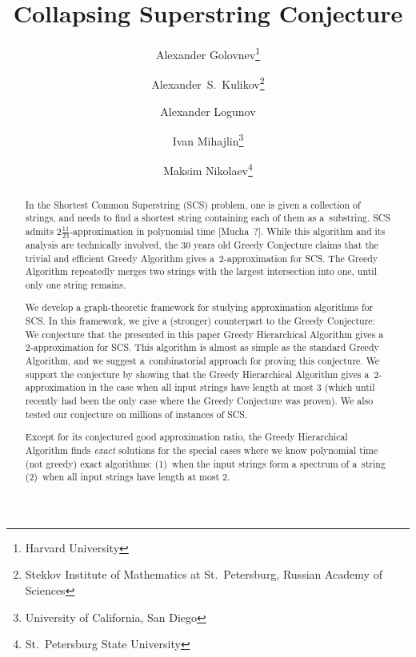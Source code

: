 \documentclass[11pt]{article}
\begin{document}
\sloppy
\begin{titlepage}
\title{Collapsing Superstring Conjecture}
\author{
Alexander Golovnev\thanks{Harvard University}
\and
Alexander~S.~Kulikov\thanks{Steklov Institute of Mathematics at St.~Petersburg, Russian Academy of Sciences}
\and
Alexander Logunov\footnotemark[2]
\and
Ivan Mihajlin\thanks{University of California, San Diego}
\and 
Maksim Nikolaev\thanks{St.~Petersburg State University}
}
\maketitle
\thispagestyle{empty}

\begin{abstract}
In the Shortest Common Superstring (SCS) problem, one is given a collection of strings, and needs to find a shortest string containing each of them as a~substring. SCS admits $2\frac{11}{23}$-approximation in polynomial time [Mucha~?]. While this algorithm and its analysis are technically involved, the $30$ years old Greedy Conjecture claims that the trivial and efficient Greedy Algorithm gives a~$2$-approximation for SCS. The Greedy Algorithm repeatedly merges two strings with the largest intersection into one, until only one string remains.

We develop a graph-theoretic framework for studying approximation algorithms for SCS. In this framework, we give a (stronger) counterpart to the Greedy Conjecture: We conjecture that the presented in this paper Greedy Hierarchical Algorithm gives a $2$-approximation for SCS. This algorithm is almost as simple as the standard Greedy Algorithm, and we suggest a~combinatorial approach for proving this conjecture. We support the conjecture by showing that the Greedy Hierarchical Algorithm gives a~$2$-approximation in the case when all input strings have length at most $3$ (which until recently had been the only case where the Greedy Conjecture was proven). We also tested our conjecture on millions of instances of SCS.

Except for its conjectured good approximation ratio, the Greedy Hierarchical Algorithm finds \emph{exact} solutions for the special cases where we know polynomial time (not greedy) exact algorithms: (1)~when the input strings form a spectrum of a~string (2)~when all input strings have length at most $2$.
\end{abstract}
\end{titlepage}

\tableofcontents









\appendix


\end{document}
